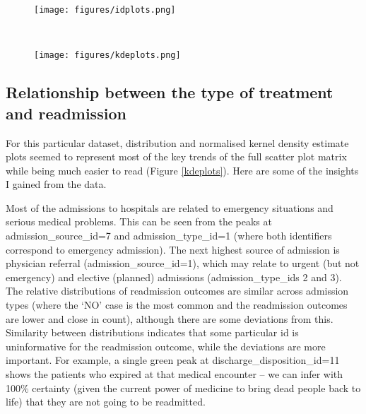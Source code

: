 \documentclass[10pt, twocolumn]{article}
\begin{document}

\begin{figure*}[t!]
	\centering
	\begin{subfigure}[t]{\textwidth}
        \centering
        \texttt{[image: figures/idplots.png]}
	\end{subfigure}
	~
	\begin{subfigure}[t]{\textwidth}
        \centering
		\texttt{[image: figures/kdeplots.png]}
    \end{subfigure}
	\caption{Distributions of admission and discharge identifiers; kernel density estimates for numerical features.}\label{kdeplots}
  \end{figure*}

\subsection{Relationship between the type of treatment and readmission}

For this particular dataset, distribution and normalised kernel density estimate plots seemed to represent most of the key trends of the full scatter plot matrix while being much easier to read (Figure \ref{kdeplots}). Here are some of the insights I gained from the data.

Most of the admissions to hospitals are related to emergency situations and serious medical problems. This can be seen from the peaks at admission\_source\_id=7 and admission\_type\_id=1 (where both identifiers correspond to emergency admission). The next highest source of admission is physician referral (admission\_source\_id=1), which may relate to urgent (but not emergency) and elective (planned) admissions (admission\_type\_ids 2 and 3). The relative distributions of readmission outcomes are similar across admission types (where the `NO' case is the most common and the readmission outcomes are lower and close in count), although there are some deviations from this. Similarity between distributions indicates that some particular id is uninformative for the readmission outcome, while the deviations are more important. For example, a single green peak at discharge\_disposition\_id=11 shows the patients who expired at that medical encounter -- we can infer with 100\% certainty (given the current power of medicine to bring dead people back to life) that they are not going to be readmitted.
\end{document}
